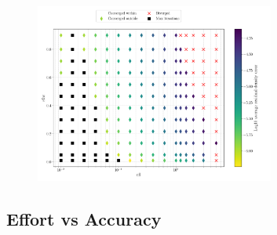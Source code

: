 \documentclass{article}
\begin{document}
\begin{figure}[H]
    \centering
    \includegraphics[width=0.7\textwidth]{figures/cfl_sfac_dro_avg.png}
    \caption{}
    \label{fig:cfl_sfac_dro_avg}
\end{figure}

\subsection{Effort vs Accuracy}
\end{document}
